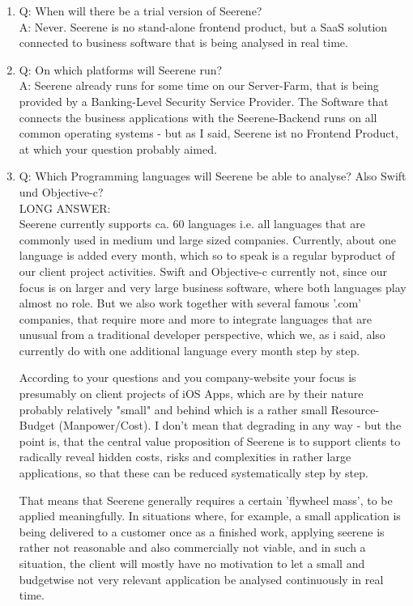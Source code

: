 \documentclass{article}
\begin{document}
\begin{enumerate}
\begin{enumerate}
		\item Q: When will there be a trial version of Seerene?\\A: Never. Seerene is no stand-alone frontend product, but a SaaS solution connected to business software that is being analysed in real time.
		\item Q: On which platforms will Seerene run?\\A: Seerene already runs for some time on our Server-Farm, that is being provided by a Banking-Level Security Service Provider. The Software that connects the business applications with the Seerene-Backend runs on all common operating systems - but as I said, Seerene ist no Frontend Product, at which your question probably aimed.
		\item Q: Which Programming languages will Seerene be able to analyse? Also Swift und Objective-c?\\LONG ANSWER:\\Seerene currently supports ca. 60 languages i.e. all languages that are commonly used in medium und large sized companies. Currently, about one language is added every month, which so to speak is a regular byproduct of our client project activities. Swift and Objective-c currently not, since our focus is on larger and very large business software, where both languages play almost no role. But we also work together with several famous '.com' companies, that require more and more to integrate languages that are unusual from a traditional developer perspective, which we, as i said, also currently do with one additional language every month step by step.

			According to your questions and you company-website your focus is presumably on client projects of iOS Apps, which are by their nature probably relatively "small" and behind which is a rather small Resource-Budget (Manpower/Cost). I don't mean that degrading in any way - but the point is, that the central value proposition of Seerene is to support clients to radically reveal hidden costs, risks and complexities in rather large applications, so that these can be reduced systematically step by step.

			That means that Seerene generally requires a certain 'flywheel mass', to be applied meaningfully. In situations where, for example, a small application is being delivered to a customer once as a finished work, applying seerene is rather not reasonable and also commercially not viable, and in such a situation, the client will mostly have no motivation to let a small and budgetwise not very relevant application be analysed continuously in real time.


\end{enumerate}
\end{enumerate}
\end{document}
